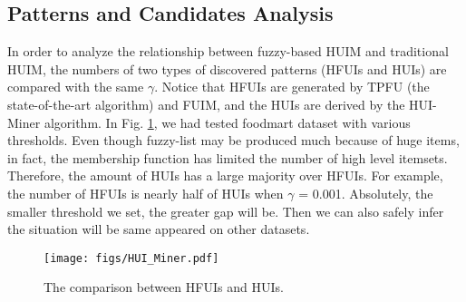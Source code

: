 \documentclass[journal]{IEEEtran}
\begin{document}
\subsection{Patterns and Candidates Analysis}

In order to analyze the relationship between fuzzy-based HUIM and traditional HUIM, the numbers of two types of discovered patterns (HFUIs and HUIs) are compared with the same $\gamma$. Notice that HFUIs are generated by TPFU (the state-of-the-art algorithm) and FUIM, and the HUIs are derived by the HUI-Miner algorithm. In Fig. \ref{fig:compare_HFUIs_with_HUIs}, we had tested foodmart dataset with various thresholds. Even though fuzzy-list may be produced much because of huge items, in fact, the membership function has limited the number of high level itemsets. Therefore, the amount of HUIs has a large majority over HFUIs. For example, the number of HFUIs is nearly half of HUIs when $\gamma$ = 0.001. Absolutely,  the smaller threshold we set, the greater gap will be. Then we can also safely infer the situation will be same appeared on other datasets.


\begin{figure}[hbt]
	\centering
	\texttt{[image: figs/HUI\_Miner.pdf]}
	\caption{The comparison between HFUIs and HUIs.}
	\label{fig:compare_HFUIs_with_HUIs}
\end{figure}
\end{document}
